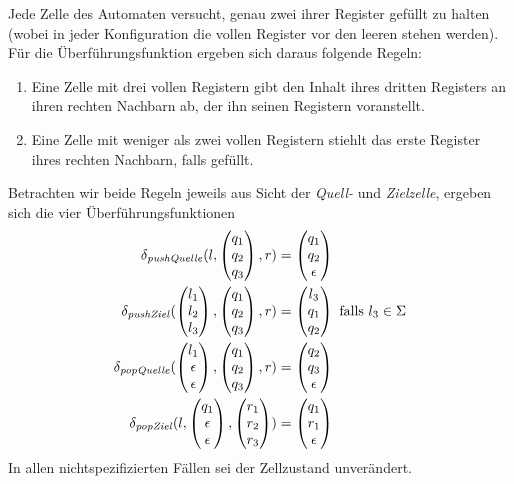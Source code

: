 \documentclass{article}
\begin{document}
Jede Zelle des Automaten versucht, genau zwei ihrer Register gefüllt zu halten (wobei in jeder Konfiguration die vollen Register vor den leeren stehen werden). Für die Überführungsfunktion ergeben sich daraus folgende Regeln:
\begin{enumerate}
    \item Eine Zelle mit drei vollen Registern gibt den Inhalt ihres dritten Registers an ihren rechten Nachbarn ab, der ihn seinen Registern voranstellt.
        \begin{center}
        \end{center}
    \item Eine Zelle mit weniger als zwei vollen Registern stiehlt das erste Register ihres rechten Nachbarn, falls gefüllt.
        \begin{center}
        \end{center}
\end{enumerate}

Betrachten wir beide Regeln jeweils aus Sicht der \emph{Quell-} und \emph{Zielzelle}, ergeben sich die vier Überführungsfunktionen
\begin{align*}
    \delta_{\mathit{pushQuelle}}(l,\begin{pmatrix}q_1\\q_2\\q_3\end{pmatrix},r) &= \begin{pmatrix}q_1\\q_2\\\epsilon\end{pmatrix} \\
    \delta_{\mathit{pushZiel}}(\begin{pmatrix}l_1\\l_2\\l_3\end{pmatrix},\begin{pmatrix}q_1\\q_2\\q_3\end{pmatrix},r) &= \begin{pmatrix}l_3\\q_1\\q_2\end{pmatrix} \text{ falls } l_3 \in \Sigma \\
    \delta_{\mathit{popQuelle}}(\begin{pmatrix}l_1\\\epsilon\\\epsilon\end{pmatrix},\begin{pmatrix}q_1\\q_2\\q_3\end{pmatrix},r) &= \begin{pmatrix}q_2\\q_3\\\epsilon\end{pmatrix} \\
    \delta_{\mathit{popZiel}}(l,\begin{pmatrix}q_1\\\epsilon\\\epsilon\end{pmatrix},\begin{pmatrix}r_1\\r_2\\r_3\end{pmatrix}) &= \begin{pmatrix}q_1\\r_1\\\epsilon\end{pmatrix}
\end{align*}
In allen nichtspezifizierten Fällen sei der Zellzustand unverändert.
\end{document}
